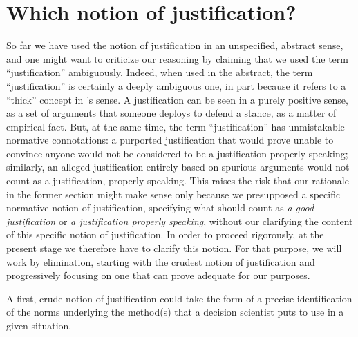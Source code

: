\documentclass[preprint, french, english, 11pt, authoryear]{elsarticle}%
\begin{document}
\section{Which notion of justification?}
So far we have used the notion of justification in an unspecified, abstract sense, and one might want to criticize our reasoning by claiming that we used the term ``justification'' ambiguously. Indeed, when used in the abstract, the term ``justification'' is certainly a deeply ambiguous one, in part because it refers to a ``thick'' concept in \citet{williams_ethics_1985}'s sense. A justification can be seen in a purely positive sense, as a set of arguments that someone deploys to defend a stance, as a matter of empirical fact. But, at the same time, the term ``justification'' has unmistakable normative connotations: a purported justification that would prove unable to convince anyone would not be considered to be a justification properly speaking; similarly, an alleged justification entirely based on spurious arguments would not count as a justification, properly speaking. This raises the risk that our rationale in the former section might make sense only because we presupposed a specific normative notion of justification, specifying what should count as \emph{a good justification} or \emph{a justification properly speaking}, without our clarifying the content of this specific notion of justification. In order to proceed rigorously, at the present stage we therefore have to clarify this notion. For that purpose, we will work by elimination, starting with the crudest notion of justification and progressively focusing on one that can prove adequate for our purposes.

A first, crude notion of justification could take the form of a precise identification of the norms underlying the method(s) that a decision scientist puts to use in a given situation.
\end{document}
